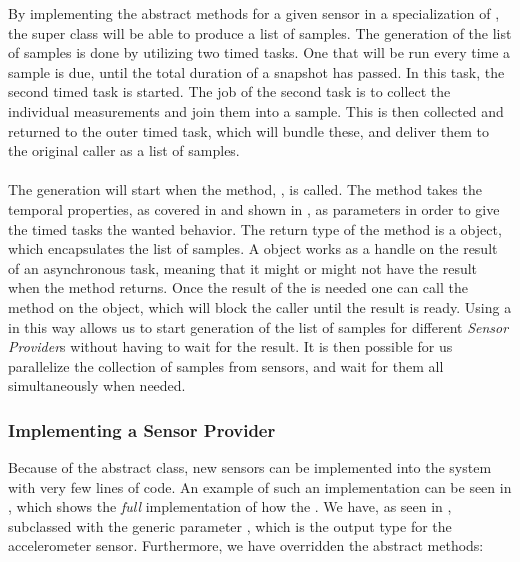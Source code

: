 By implementing the abstract methods for a given sensor in a specialization of , the super class will be able to produce a list of samples. The generation of the list of samples is done by utilizing two timed tasks. One that will be run every time a sample is due, until the total duration of a snapshot has passed. In this task, the second timed task is started. The job of the second task is to collect the individual measurements and join them into a sample. This is then collected and returned to the outer timed task, which will bundle these, and deliver them to the original caller as a list of samples. 
\\\\
The generation will start when the method, , is called. The method takes the temporal properties, as covered in  and shown in , as parameters in order to give the timed tasks the wanted behavior. The return type of the method is a  object, which encapsulates the list of samples. A  object works as a handle on the result of an asynchronous task, meaning that it might or might not have the result when the method returns. Once the result of the  is needed one can call the  method on the object, which will block the caller until the result is ready. Using a  in this way allows us to start generation of the list of samples for different \emph{Sensor Provider}s without having to wait for the result. It is then possible for us parallelize the collection of samples from sensors, and wait for them all simultaneously when needed. %

\subsubsection{Implementing a Sensor Provider}
Because of the abstract  class, new sensors can be implemented into the system with very few lines of code. An example of such an implementation can be seen in , which shows the \emph{full} implementation of how the . We have, as seen in , subclassed  with the generic parameter , which is the output type for the accelerometer sensor. Furthermore, we have overridden the abstract methods: 

